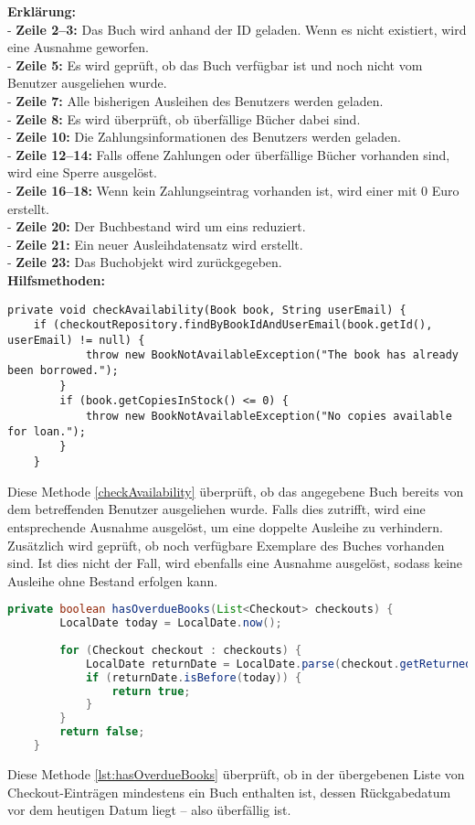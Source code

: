 \noindent \textbf{Erklärung:}\\
- \textbf{Zeile 2--3:} Das Buch wird anhand der ID geladen. Wenn es nicht existiert, wird eine Ausnahme geworfen. \\
- \textbf{Zeile 5:} Es wird geprüft, ob das Buch verfügbar ist und noch nicht vom Benutzer ausgeliehen wurde. \\
- \textbf{Zeile 7:} Alle bisherigen Ausleihen des Benutzers werden geladen. \\
- \textbf{Zeile 8:} Es wird überprüft, ob überfällige Bücher dabei sind.\\
- \textbf{Zeile 10:} Die Zahlungsinformationen des Benutzers werden geladen.\\
- \textbf{Zeile 12--14:} Falls offene Zahlungen oder überfällige Bücher vorhanden sind, wird eine Sperre ausgelöst.\\
- \textbf{Zeile 16--18:} Wenn kein Zahlungseintrag vorhanden ist, wird einer mit 0 Euro erstellt.\\
- \textbf{Zeile 20:} Der Buchbestand wird um eins reduziert.\\
- \textbf{Zeile 21:} Ein neuer Ausleihdatensatz wird erstellt.\\
- \textbf{Zeile 23:} Das Buchobjekt wird zurückgegeben.\\

\noindent \textbf{Hilfsmethoden:}
\begin{lstlisting}[style=pseudocode, caption=Überprüfung der Verfügbarkeit eines Buches, label=checkAvailability]
	private void checkAvailability(Book book, String userEmail) {
	if (checkoutRepository.findByBookIdAndUserEmail(book.getId(), userEmail) != null) {
			throw new BookNotAvailableException("The book has already been borrowed.");
		}
		if (book.getCopiesInStock() <= 0) {
			throw new BookNotAvailableException("No copies available for loan.");
		}
	}
\end{lstlisting}
Diese Methode \ref{checkAvailability} überprüft, ob das angegebene Buch bereits von dem betreffenden Benutzer ausgeliehen wurde. Falls dies zutrifft, wird eine entsprechende Ausnahme ausgelöst, um eine doppelte Ausleihe zu verhindern. Zusätzlich wird geprüft, ob noch verfügbare Exemplare des Buches vorhanden sind. Ist dies nicht der Fall, wird ebenfalls eine Ausnahme ausgelöst, sodass keine Ausleihe ohne Bestand erfolgen kann.

\begin{lstlisting}[language=Java, caption=Prüfung auf überfällige Ausleihen, label=lst:hasOverdueBooks]
	private boolean hasOverdueBooks(List<Checkout> checkouts) {
		LocalDate today = LocalDate.now();
		
		for (Checkout checkout : checkouts) {
			LocalDate returnDate = LocalDate.parse(checkout.getReturnedAt());
			if (returnDate.isBefore(today)) {
				return true;
			}
		}
		return false;
	}
\end{lstlisting}
Diese Methode  \ref{lst:hasOverdueBooks} überprüft, ob in der übergebenen Liste von Checkout-Einträgen mindestens ein Buch enthalten ist, dessen Rückgabedatum vor dem heutigen Datum liegt – also überfällig ist.

